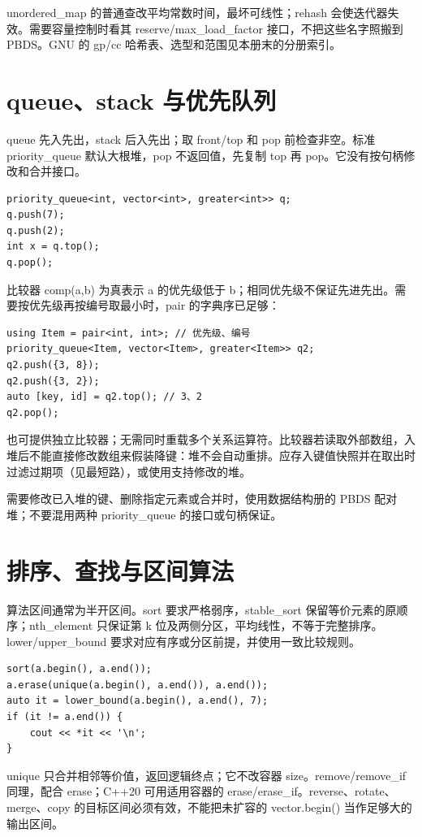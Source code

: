 unordered\_map 的普通查改平均常数时间，最坏可线性；rehash 会使迭代器失效。需要容量控制时看其 reserve/max\_load\_factor 接口，不把这些名字照搬到 PBDS。GNU 的 gp/cc 哈希表、选型和范围见本册末的分册索引。

\section{queue、stack 与优先队列}
queue 先入先出，stack 后入先出；取 front/top 和 pop 前检查非空。标准 priority\_queue 默认大根堆，pop 不返回值，先复制 top 再 pop。它没有按句柄修改和合并接口。
\begin{lstlisting}
priority_queue<int, vector<int>, greater<int>> q;
q.push(7);
q.push(2);
int x = q.top();
q.pop();
\end{lstlisting}
比较器 comp(a,b) 为真表示 a 的优先级低于 b；相同优先级不保证先进先出。需要按优先级再按编号取最小时，pair 的字典序已足够：
\begin{lstlisting}
using Item = pair<int, int>; // 优先级、编号
priority_queue<Item, vector<Item>, greater<Item>> q2;
q2.push({3, 8});
q2.push({3, 2});
auto [key, id] = q2.top(); // 3、2
q2.pop();
\end{lstlisting}
也可提供独立比较器；无需同时重载多个关系运算符。比较器若读取外部数组，入堆后不能直接修改数组来假装降键：堆不会自动重排。应存入键值快照并在取出时过滤过期项（见最短路），或使用支持修改的堆。

需要修改已入堆的键、删除指定元素或合并时，使用数据结构册的 PBDS 配对堆；不要混用两种 priority\_queue 的接口或句柄保证。

\section{排序、查找与区间算法}
算法区间通常为半开区间。sort 要求严格弱序，stable\_sort 保留等价元素的原顺序；nth\_element 只保证第 k 位及两侧分区，平均线性，不等于完整排序。lower/upper\_bound 要求对应有序或分区前提，并使用一致比较规则。
\begin{lstlisting}
sort(a.begin(), a.end());
a.erase(unique(a.begin(), a.end()), a.end());
auto it = lower_bound(a.begin(), a.end(), 7);
if (it != a.end()) {
    cout << *it << '\n';
}
\end{lstlisting}
unique 只合并相邻等价值，返回逻辑终点；它不改容器 size。remove/remove\_if 同理，配合 erase；C++20 可用适用容器的 erase/erase\_if。reverse、rotate、merge、copy 的目标区间必须有效，不能把未扩容的 vector.begin() 当作足够大的输出区间。

